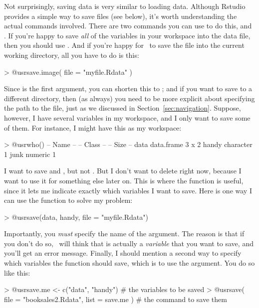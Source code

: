 Not surprisingly, saving data is very similar to loading data. Although Rstudio provides a simple way to save files (see below), it's worth understanding the actual commands involved. There are two commands you can use to do this,  and . If you're happy to save {\it all} of the variables in your workspace into the data file, then you should use . And if you're happy for \R\ to save the file into the current working directory, all you have to do is this:
\begin{rblock1}
> @usr{save.image( file = "myfile.Rdata" )}
\end{rblock1}
Since  is the first argument, you can shorten this to ; and if you want to save to a different directory, then (as always) you need to be more explicit about specifying the path to the file, just as we discussed in Section~\ref{sec:navigation}. Suppose, however, I have several variables in my workspace, and I only want to save some of them. For instance, I might have this as my workspace:
\begin{rblock1}
> @usr{who()}
   -- Name --   -- Class --   -- Size --
   data         data.frame    3 x 2     
   handy        character     1         
   junk         numeric       1        
\end{rblock1}
I want to save  and , but not . But I don't want to delete  right now, because I want to use it for something else later on. This is where the  function is useful, since it lets me indicate exactly which variables I want to save. Here is one way I can use the  function to solve my problem:
\begin{rblock1}
> @usr{save(data, handy, file = "myfile.Rdata")}
\end{rblock1}
Importantly, you {\it must} specify the name of the  argument. The reason is that if you don't do so, \R\ will think that  is actually a {\it variable} that you want to save, and you'll get an error message. Finally, I should mention a second way to specify which variables the  function should save, which is to use the  argument. You do so like this:
\begin{rblock1}
> @usr{save.me <- c("data", "handy")}   # the variables to be saved
> @usr{save( file = "booksales2.Rdata", list = save.me )}   # the command to save them
\end{rblock1}


